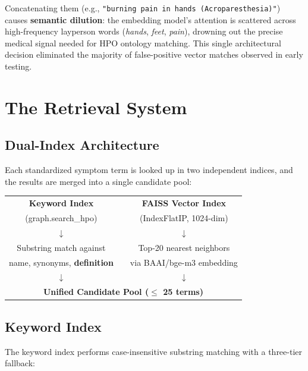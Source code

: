 \documentclass[11pt,a4paper]{article}
\begin{document}
Concatenating them (e.g., \texttt{"burning pain in hands (Acroparesthesia)"}) causes \textbf{semantic dilution}: the embedding model's attention is scattered across high-frequency layperson words (\textit{hands}, \textit{feet}, \textit{pain}), drowning out the precise medical signal needed for HPO ontology matching. This single architectural decision eliminated the majority of false-positive vector matches observed in early testing.

\newpage

\section{The Retrieval System}

\subsection{Dual-Index Architecture}

Each standardized symptom term is looked up in two independent indices, and the results are merged into a single candidate pool:

\begin{center}
\begin{tabular}{ccc}
\textbf{Keyword Index} & \qquad & \textbf{FAISS Vector Index} \\
\small(graph.search\_hpo) & & \small(IndexFlatIP, 1024-dim) \\
$\downarrow$ & & $\downarrow$ \\
\small Substring match against & & \small Top-20 nearest neighbors \\
\small name, synonyms, \textbf{definition} & & \small via BAAI/bge-m3 embedding \\
$\downarrow$ & & $\downarrow$ \\
\multicolumn{3}{c}{\textbf{Unified Candidate Pool ($\leq$ 25 terms)}} \\
\end{tabular}
\end{center}

\subsection{Keyword Index}

The keyword index performs case-insensitive substring matching with a three-tier fallback:
\end{document}
